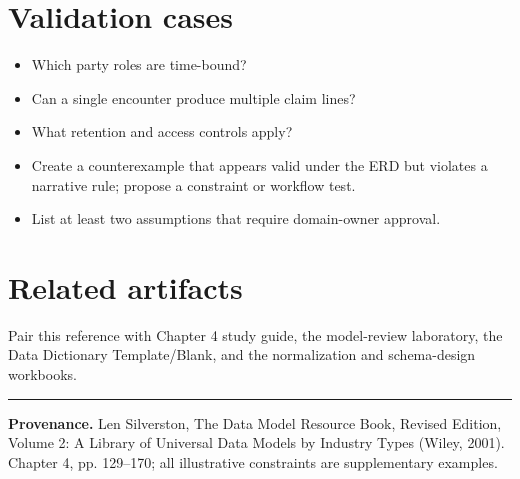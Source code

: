 \documentclass[11pt,letterpaper]{article}
\begin{document}
\section{Validation cases}
\begin{itemize}
\item Which party roles are time-bound?
\item Can a single encounter produce multiple claim lines?
\item What retention and access controls apply?
\item Create a counterexample that appears valid under the ERD but violates a narrative rule; propose a constraint or workflow test.
\item List at least two assumptions that require domain-owner approval.
\end{itemize}

\section{Related artifacts}
Pair this reference with Chapter 4 study guide, the model-review laboratory, the Data Dictionary Template/Blank, and the normalization and schema-design workbooks.


\vfill
\hrule
{\footnotesize\textbf{Provenance.} Len Silverston, The Data Model Resource Book, Revised Edition, Volume 2: A Library of Universal Data Models by Industry Types (Wiley, 2001). Chapter 4, pp. 129--170; all illustrative constraints are supplementary examples.}
\end{document}
